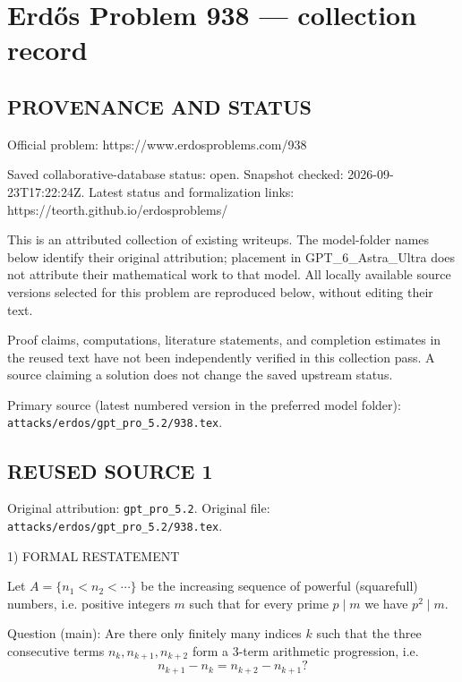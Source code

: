 \section*{Erd\H{o}s Problem 938 --- collection record}

\subsection*{PROVENANCE AND STATUS}
Official problem: https://www.erdosproblems.com/938

Saved collaborative-database status: open.
Snapshot checked: 2026-09-23T17:22:24Z.
Latest status and formalization links: https://teorth.github.io/erdosproblems/

This is an attributed collection of existing writeups. The model-folder names below identify their original attribution; placement in GPT\_6\_Astra\_Ultra does not attribute their mathematical work to that model. All locally available source versions selected for this problem are reproduced below, without editing their text.

Proof claims, computations, literature statements, and completion estimates in the reused text have not been independently verified in this collection pass. A source claiming a solution does not change the saved upstream status.

Primary source (latest numbered version in the preferred model folder): \texttt{attacks/erdos/gpt\_pro\_5.2/938.tex}.

\subsection*{REUSED SOURCE 1}
Original attribution: \texttt{gpt\_pro\_5.2}.
Original file: \texttt{attacks/erdos/gpt\_pro\_5.2/938.tex}.


1) FORMAL RESTATEMENT

Let \(A=\{n_1<n_2<\cdots\}\) be the increasing sequence of powerful (squarefull) numbers, i.e. positive integers \(m\) such that for every prime \(p\mid m\) we have \(p^2\mid m\).

Question (main): Are there only finitely many indices \(k\) such that the three consecutive terms \(n_k,n_{k+1},n_{k+2}\) form a 3-term arithmetic progression, i.e.
\[n_{k+1}-n_k = n_{k+2}-n_{k+1}?\]

